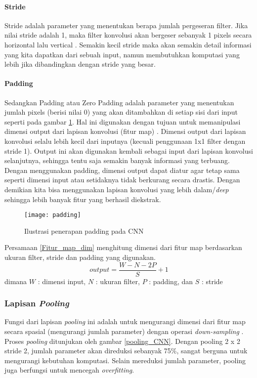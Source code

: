 \documentclass[../thesis.tex]{subfiles}
\begin{document}
\paragraph{Stride}

Stride adalah parameter yang menentukan berapa jumlah pergeseran filter. Jika nilai stride adalah 1, maka filter konvolusi akan bergeser sebanyak 1 pixels secara horizontal lalu vertical \cite{KarpathyCNN}. 
Semakin kecil stride maka akan semakin detail informasi yang kita dapatkan dari sebuah input, namun membutuhkan komputasi yang lebih jika dibandingkan dengan stride yang besar.

\paragraph{Padding}

Sedangkan Padding atau Zero Padding adalah parameter yang menentukan jumlah pixels (berisi nilai 0) yang akan ditambahkan di setiap sisi dari input seperti pada gambar \ref{padding_CNN}. Hal ini digunakan dengan tujuan untuk memanipulasi dimensi output dari lapisan konvolusi (fitur map) \cite{KarpathyCNN}.
Dimensi output dari lapisan konvolusi selalu lebih kecil dari inputnya (kecuali penggunaan 1x1 filter dengan stride 1). Output ini akan digunakan kembali sebagai input dari lapisan konvolusi selanjutnya, sehingga tentu saja semakin banyak informasi yang terbuang.
Dengan menggunakan padding, dimensi output dapat diatur agar tetap sama seperti dimensi input atau setidaknya tidak berkurang secara drastis. Dengan demikian kita bisa menggunakan lapisan konvolusi yang lebih dalam/\textit{deep} sehingga lebih banyak fitur yang berhasil diekstrak.

\begin{figure}[htp]
	\centering
	\texttt{[image: padding]}
	\caption{Ilustrasi penerapan padding pada CNN}
	\label{padding_CNN}
\end{figure}

Persamaan \ref{Fitur_map_dim} menghitung dimensi dari fitur map berdasarkan ukuran filter, stride dan padding yang digunakan.
\begin{equation}\label{Fitur_map_dim}
	output =\frac {W-N-2P}{S}+1
\end{equation}
dimana $W$ : dimensi input, $N$ : ukuran filter, $P$ : padding, dan $S$ : stride


\subsubsection{Lapisan \textit{Pooling}}
Fungsi dari lapisan \textit{pooling} ini adalah untuk mengurangi dimensi dari fitur map secara spasial (mengurangi jumlah
parameter) dengan operasi \textit{down-sampling} \cite{CNNinImageNet}. Proses \textit{pooling} ditunjukan oleh gambar \ref{pooling_CNN}. Dengan pooling 2 x 2 stride 2, jumlah parameter akan direduksi sebanyak 75\%, sangat berguna untuk mengurangi kebutuhan komputasi. Selain
mereduksi jumlah parameter, pooling juga berfungsi untuk mencegah \textit{overfitting}.
\end{document}
